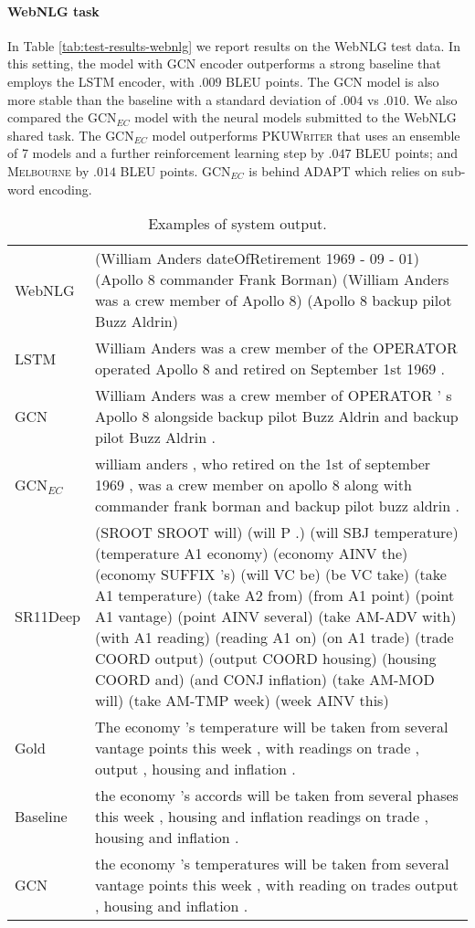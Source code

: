 \documentclass[11pt,a4paper,dvipsnames]{article}
\begin{document}
\paragraph{WebNLG task}

In Table \ref{tab:test-results-webnlg} we report results on the WebNLG test data.
In this setting, the model with GCN encoder outperforms a strong baseline that employs the LSTM encoder, with $.009$ BLEU points. 
The GCN model is also more stable than the baseline with a standard deviation of $.004$ vs $.010$.
We also compared the GCN$_{EC}$ model with the neural models submitted to the WebNLG shared task.
The GCN$_{EC}$ model outperforms \textsc{PKUWriter} that uses an ensemble 
of 7 models and a further reinforcement learning step by $.047$ BLEU points; and \textsc{Melbourne} by $.014$ BLEU points.
GCN$_{EC}$ is behind \textsc{ADAPT} which relies on sub-word encoding.

\begin{table*}[t]
\begin{scriptsize}
 \begin{tabular}{|@{~}p{0.8cm}p{14.5cm}@{~}|}
  \hline
WebNLG & (William Anders dateOfRetirement 1969 - 09 - 01) (Apollo 8 commander Frank Borman) (William Anders was a crew member of Apollo 8)  (Apollo 8 backup pilot Buzz Aldrin)\\
  LSTM & William Anders was a crew member of the OPERATOR operated Apollo 8 and retired on September 1st 1969 .\\
  GCN & William Anders was a crew member of OPERATOR ' s Apollo 8 alongside backup pilot Buzz Aldrin and backup pilot Buzz Aldrin .\\
  GCN$_{EC}$ & william anders , who retired on the 1st of september 1969 , was a crew member on apollo 8 along with commander frank borman and backup pilot buzz aldrin .\\

  \hline
SR11Deep & (SROOT SROOT will) (will P .) (will SBJ temperature) (temperature A1 economy) (economy AINV the) (economy SUFFIX 's) (will VC be) (be VC take) (take A1 temperature) (take A2 from) (from A1 point) (point A1 vantage) (point AINV several) (take AM-ADV with) (with A1 reading) (reading A1 on) (on A1 trade) (trade COORD output) (output COORD housing) (housing COORD and) (and CONJ inflation) (take AM-MOD will) (take AM-TMP week) (week AINV this)\\
  Gold & The economy 's temperature will be taken from several vantage points this week , with readings on trade , output , housing and inflation . \\
  Baseline & the economy 's accords will be taken from several phases this week , housing and inflation readings on trade , housing and inflation .\\
  GCN & the economy 's temperatures will be taken from several vantage points this week , with reading on trades output , housing and inflation .\\
\hline
 \end{tabular} 
\end{scriptsize}
\vspace*{-1.5ex}
\caption{\label{tab:sys-output} Examples of system output.}
\end{table*} 
\end{document}
